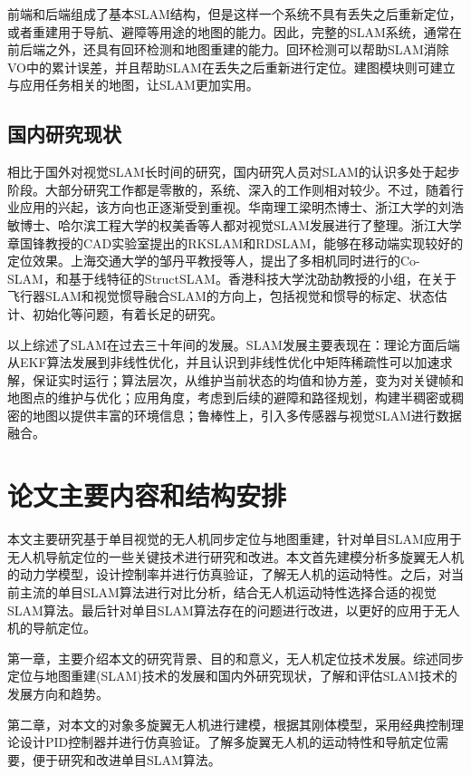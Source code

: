前端和后端组成了基本SLAM结构，但是这样一个系统不具有丢失之后重新定位，或者重建用于导航、避障等用途的地图的能力。因此，完整的SLAM系统，通常在前后端之外，还具有回环检测和地图重建的能力。回环检测可以帮助SLAM消除VO中的累计误差，并且帮助SLAM在丢失之后重新进行定位\upcite{[1.40]}。建图模块则可建立与应用任务相关的地图，让SLAM更加实用\upcite{[1.41]}。


\subsection{国内研究现状}
相比于国外对视觉SLAM长时间的研究，国内研究人员对SLAM的认识多处于起步阶段。大部分研究工作都是零散的，系统、深入的工作则相对较少。不过，随着行业应用的兴起，该方向也正逐渐受到重视。华南理工梁明杰博士\upcite{[1.42]}、浙江大学的刘浩敏博士\upcite{[1.43]}、哈尔滨工程大学的权美香\upcite{[1.44]}等人都对视觉SLAM发展进行了整理。浙江大学章国锋教授的CAD实验室提出的RKSLAM\upcite{[1.45]}和RDSLAM\upcite{[1.46]}，能够在移动端实现较好的定位效果。上海交通大学的邹丹平教授等人，提出了多相机同时进行的Co-SLAM\upcite{[1.47]}，和基于线特征的StructSLAM\upcite{[1.48]}。香港科技大学沈劭劼教授\upcite{[1.49]}的小组，在关于飞行器SLAM和视觉惯导融合SLAM的方向上，包括视觉和惯导的标定、状态估计、初始化等问题，有着长足的研究。


以上综述了SLAM在过去三十年间的发展。SLAM发展主要表现在：理论方面后端从EKF算法发展到非线性优化，并且认识到非线性优化中矩阵稀疏性可以加速求解，保证实时运行；算法层次，从维护当前状态的均值和协方差，变为对关键帧和地图点的维护与优化；应用角度，考虑到后续的避障和路径规划，构建半稠密或稠密的地图以提供丰富的环境信息；鲁棒性上，引入多传感器与视觉SLAM进行数据融合。

\section{论文主要内容和结构安排}
本文主要研究基于单目视觉的无人机同步定位与地图重建，针对单目SLAM应用于无人机导航定位的一些关键技术进行研究和改进。本文首先建模分析多旋翼无人机的动力学模型，设计控制率并进行仿真验证，了解无人机的运动特性。之后，对当前主流的单目SLAM算法进行对比分析，结合无人机运动特性选择合适的视觉SLAM算法。最后针对单目SLAM算法存在的问题进行改进，以更好的应用于无人机的导航定位。

第一章，主要介绍本文的研究背景、目的和意义，无人机定位技术发展。综述同步定位与地图重建(SLAM)技术的发展和国内外研究现状，了解和评估SLAM技术的发展方向和趋势。

第二章，对本文的对象多旋翼无人机进行建模，根据其刚体模型，采用经典控制理论设计PID控制器并进行仿真验证。了解多旋翼无人机的运动特性和导航定位需要，便于研究和改进单目SLAM算法。

